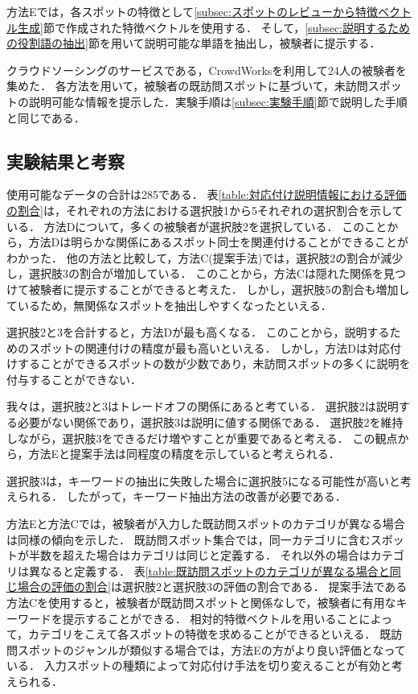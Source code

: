 \documentclass[submit]{ipsj}
\begin{document}
方法Eでは，各スポットの特徴として\ref{subsec:スポットのレビューから特徴ベクトル生成}節で作成された特徴ベクトルを使用する．
そして，\ref{subsec:説明するための役割語の抽出}節を用いて説明可能な単語を抽出し，被験者に提示する．

クラウドソーシングのサービスである，CrowdWorksを利用して24人の被験者を集めた．
各方法を用いて，被験者の既訪問スポットに基づいて，未訪問スポットの説明可能な情報を提示した．実験手順は\ref{subsec:実験手順}節で説明した手順と同じである．

\subsection{実験結果と考察}

使用可能なデータの合計は285である．
表\ref{table:対応付け説明情報における評価の割合}は，それぞれの方法における選択肢1から5それぞれの選択割合を示している．
方法Dについて，多くの被験者が選択肢2を選択している．
このことから，方法Dは明らかな関係にあるスポット同士を関連付けることができることがわかった．
他の方法と比較して，方法C(提案手法)では，選択肢2の割合が減少し，選択肢3の割合が増加している．
このことから，方法Cは隠れた関係を見つけて被験者に提示することができると考えた．
しかし，選択肢5の割合も増加しているため，無関係なスポットを抽出しやすくなったといえる．

選択肢2と3を合計すると，方法Dが最も高くなる．
このことから，説明するためのスポットの関連付けの精度が最も高いといえる．
しかし，方法Dは対応付けすることができるスポットの数が少数であり，未訪問スポットの多くに説明を付与することができない．

我々は，選択肢2と3はトレードオフの関係にあると考ている．
選択肢2は説明する必要がない関係であり，選択肢3は説明に値する関係である．
選択肢2を維持しながら，選択肢3をできるだけ増やすことが重要であると考える．
この観点から，方法Eと提案手法は同程度の精度を示していると考えられる．

選択肢3は，キーワードの抽出に失敗した場合に選択肢5になる可能性が高いと考えられる．
したがって，キーワード抽出方法の改善が必要である．

方法Eと方法Cでは，被験者が入力した既訪問スポットのカテゴリが異なる場合は同様の傾向を示した．
既訪問スポット集合では，同一カテゴリに含むスポットが半数を超えた場合はカテゴリは同じと定義する．
それ以外の場合はカテゴリは異なると定義する．
表\ref{table:既訪問スポットのカテゴリが異なる場合と同じ場合の評価の割合}は選択肢2と選択肢3の評価の割合である．
提案手法である方法Cを使用すると，被験者が既訪問スポットと関係なしで，被験者に有用なキーワードを提示することができる．
相対的特徴ベクトルを用いることによって，カテゴリをこえて各スポットの特徴を求めることができるといえる．
既訪問スポットのジャンルが類似する場合では，方法Eの方がより良い評価となっている．
入力スポットの種類によって対応付け手法を切り変えることが有効と考えられる．
\end{document}
